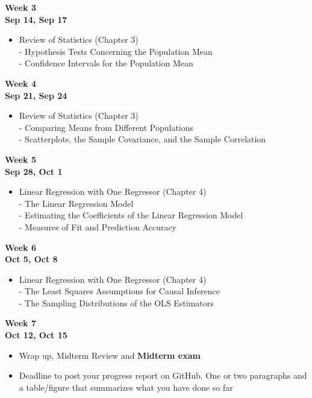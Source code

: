 \documentclass[
]{book}
\providecommand{\tightlist}{%
  \setlength{\itemsep}{0pt}\setlength{\parskip}{0pt}}
\begin{document}
\textbf{Week 3}\\
\textbf{Sep 14, Sep 17}

\begin{itemize}
\tightlist
\item
  Review of Statistics (Chapter 3)\\
  - Hypothesis Tests Concerning the Population Mean\\
  - Confidence Intervals for the Population Mean
\end{itemize}

\textbf{Week 4}\\
\textbf{Sep 21, Sep 24}

\begin{itemize}
\tightlist
\item
  Review of Statistics (Chapter 3)\\
  - Comparing Means from Different Populations\\
  - Scatterplots, the Sample Covariance, and the Sample Correlation
\end{itemize}

\textbf{Week 5}\\
\textbf{Sep 28, Oct 1}

\begin{itemize}
\tightlist
\item
  Linear Regression with One Regressor (Chapter 4)\\
  - The Linear Regression Model\\
  - Estimating the Coefficients of the Linear Regression Model\\
  - Measures of Fit and Prediction Accuracy
\end{itemize}

\textbf{Week 6}\\
\textbf{Oct 5, Oct 8}

\begin{itemize}
\tightlist
\item
  Linear Regression with One Regressor (Chapter 4)\\
  - The Least Squares Assumptions for Causal Inference\\
  - The Sampling Distributions of the OLS Estimators
\end{itemize}

\textbf{Week 7}\\
\textbf{Oct 12, Oct 15}

\begin{itemize}
\tightlist
\item
  Wrap up, Midterm Review and \textbf{Midterm exam}
\item
  Deadline to post your progress report on GitHub. One or two paragraphs and a table/figure that summarizes what you have done so far
\end{itemize}
\end{document}

